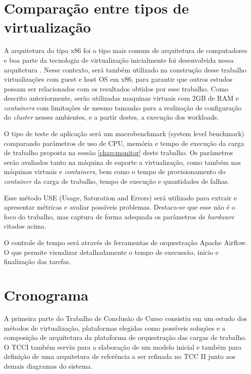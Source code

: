 \section{Comparação entre tipos de virtualização}

A arquitetura do tipo x86 foi o tipo mais comum de arquitetura de computadores e boa parte da tecnologia de virtualização inicialmente foi desenvolvida nessa arquitetura \cite{fayyad_benchmarking_2013}. Nesse contexto, será também utilizado na construção desse trabalho virtualizações com guest e host OS em x86, para garantir que outros estudos possam ser relacionados com os resultados obtidos por esse trabalho.
Como descrito anteriormente, serão utilizadas maquinas virtuais com 2GB de RAM e  \emph{containers} com limitações de mesmo tamanho para a realização de configuração do  \emph{cluster} nesses ambientes, e a partir destes, a execução dos workloads.

O tipo de teste de aplicação será um macrobenchmark (system level benchmark) \cite{huge2008,scheepers2014virtualization} comparando parâmetros de uso de CPU, memória e tempo de execução da carga de trabalho proposta na sessão \ref{chap:monitor} deste trabalho. Os parâmetros serão avaliados tanto na máquina de suporte a virtualização, como também nas máquinas virtuais e  \emph{containers}, bem como o tempo de provisionamento do  \emph{container} da carga de trabalho, tempo de execução e quantidades de falhas.

Esse método USE (Usage, Saturation and Errors) \cite{greg2022} será utilizado para extrair e apresentar métricas e avaliar possíveis problemas. Destaca-se que esse não é o foco do trabalho, mas captura de forma adequada os parâmetros de \emph{hardware} citados acima.

O controle de tempo será através de ferramentas de orquestração {Apache Airflow}\textregistered. O que permite visualizar detalhadamente o tempo de execussão, inicio e finalização das tarefas.

\section{Cronograma}
A primeira parte do Trabalho de Conclusão de Curso consistiu em um estudo dos métodos de virtualização, plataformas elegidas como possíveis soluções e a composição de arquitetura da plataforma de orquestração das cargas de trabalho. O TCCI também serviu para a elaboração de um modelo inicial e também para definição de uma arquitetura de referência a ser refinada no TCC II junto aos demais diagramas do sistema.


